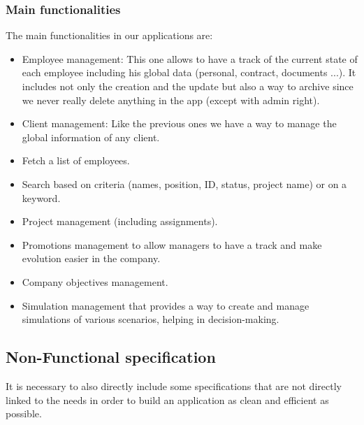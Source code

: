 \documentclass[12pt,a4paper,table,english]{article}
\begin{document}
	\subsubsection{Main functionalities}
	The main functionalities in our applications are:
	\begin{itemize}		
		\item Employee management: This one allows to have a track of the current state of each employee including his global data (personal, contract, documents ...). It includes not only the creation and the update but also a way to archive since we never really delete anything in the app (except with admin right).
		
		\item Client management: Like the previous ones we have a way to manage the global information of any client.
		
		\item Fetch a list of employees.
		
		\item Search based on criteria (names, position, ID, status, project name) or on a keyword.
		
		\item Project management (including assignments).
		
		\item Promotions management to allow managers to have a track and make evolution easier in the company.
		
		\item Company objectives management.
		
		\item Simulation management that provides a way to create and manage simulations of various scenarios, helping in decision-making.
		
	\end{itemize}


	\newpage
	
	\subsection{Non-Functional specification}
	
	It is necessary to also directly include some specifications that are not directly linked to the needs in order to build an application as clean and efficient as possible.
	
\end{document}
